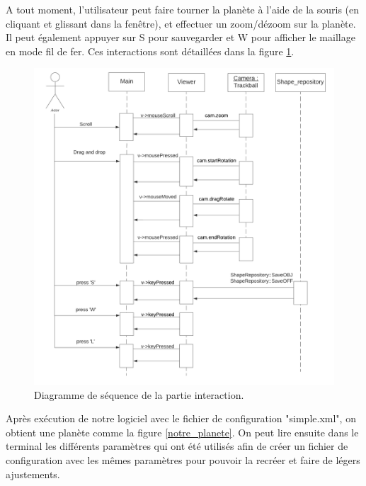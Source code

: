 \documentclass[a4paper]{article}
\begin{document}
\newpage
A tout moment, l'utilisateur peut faire tourner la planète à l'aide de la souris (en cliquant et glissant dans la fenêtre), et effectuer un zoom/dézoom sur la planète. Il peut également appuyer sur S pour sauvegarder et W pour afficher le maillage en mode fil de fer. Ces interactions sont détaillées dans la figure \ref{seqinter}.

\begin{figure}[!ht]
    \begin{center}
        \includegraphics[width=0.7\linewidth]{img/interaction_seq.png} 
        \caption{Diagramme de séquence de la partie interaction.}
        \label{seqinter}
    \end{center}
\end{figure}

\newpage
Après exécution de notre logiciel avec le fichier de configuration "simple.xml", on obtient une planète comme la figure \ref{notre_planete}. On peut lire ensuite dans le terminal les différents paramètres qui ont été utilisés afin de créer un fichier de configuration avec les mêmes paramètres pour pouvoir la recréer et faire de légers ajustements.\\
\end{document}
